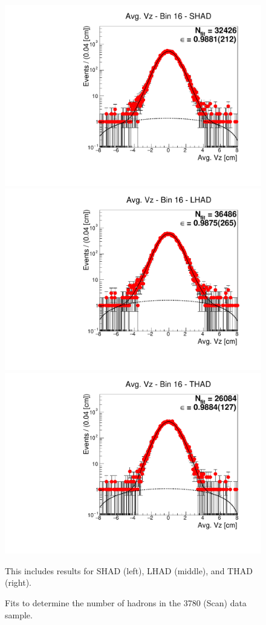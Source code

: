 \begin{figure}[H]
\centering
\includegraphics[scale=0.25]{figures/plots/nonDDbar_fit_results/scan/fit_scan_16_data_SHAD.pdf}
\hspace{-0.5cm}
\includegraphics[scale=0.25]{figures/plots/nonDDbar_fit_results/scan/fit_scan_16_data_LHAD.pdf}
\hspace{-0.5cm}
\includegraphics[scale=0.25]{figures/plots/nonDDbar_fit_results/scan/fit_scan_16_data_THAD.pdf}
\caption{Fits to determine the number of hadrons in the 3780 (Scan) data sample.}
{This includes results for SHAD (left), LHAD (middle), and THAD (right).}
\label{fig:hadron_fits_scan_16}
\end{figure}

